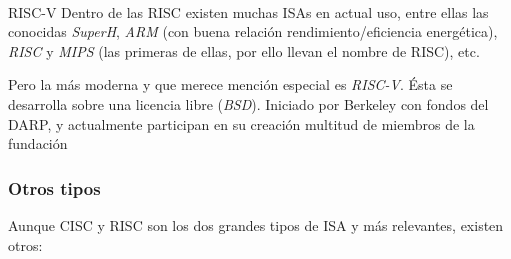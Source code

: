 \documentclass[a4paper, 11pt, titlepage]{article}
\begin{document}
            \paragraph{}{RISC-V} Dentro de las RISC existen muchas ISAs en actual uso, entre ellas las conocidas \textit{SuperH}, \textit{ARM} 
            (con buena relación rendimiento/eficiencia energética), \textit{RISC} y \textit{MIPS} (las primeras de ellas, por 
            ello llevan el nombre de RISC), etc.

            Pero la más moderna y que merece mención especial es \textit{RISC-V}. Ésta se desarrolla sobre una licencia 
            libre (\textit{BSD}). Iniciado por Berkeley con fondos del DARP, y actualmente participan en su creación multitud 
            de miembros de la fundación

        \subsubsection{Otros tipos}

            Aunque CISC y RISC son los dos grandes tipos de ISA y más relevantes, existen otros:
            
\end{document}
